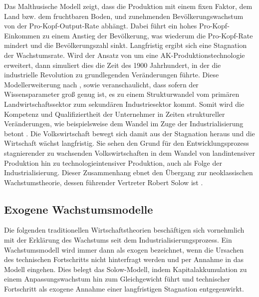 %
Das Malthusische Modell zeigt, dass die Produktion mit einem fixen Faktor, dem Land bzw. dem fruchtbaren Boden, und zunehmenden Bevölkerungswachstum von der Pro-Kopf-Output-Rate abhängt. Dabei führt ein hohes Pro-Kopf-Einkommen zu einem Anstieg der Bevölkerung, was wiederum die Pro-Kopf-Rate mindert und die Bevölkerungszahl sinkt.  Langfristig ergibt sich eine Stagnation der Wachstumsrate. Wird der Ansatz von \cite{Malthus.1798} um eine AK-Produktionstechnologie erweitert, dann simuliert dies die Zeit des 1900 Jahrhundert, in der die industrielle Revolution zu grundlegenden Veränderungen führte. Diese Modellerweiterung nach \cite{Hansen.2002}, sowie \cite{Ashraf.2008} veranschaulicht, dass sofern der Wissensparameter groß genug ist, es zu einem Strukturwandel vom primären Landwirtschaftssektor zum sekundären Industriesektor kommt. Somit wird die Kompetenz und Qualifiziertheit der Unternehmer in Zeiten struktureller Veränderungen, wie beispielsweise dem Wandel im Zuge der Industrialisierung betont \cite{Galor.1997}.
Die Volkswirtschaft bewegt sich damit aus der Stagnation heraus und die Wirtschaft wächst langfristig. Sie sehen den Grund für den Entwicklungsprozess stagnierender zu wachsenden Volkswirtschaften in dem Wandel von landintensiver Produktion hin zu technologieintensiver Produktion, auch als Folge der Industrialisierung. Dieser Zusammenhang ebnet den Übergang zur neoklassischen Wachstumstheorie, dessen führender Vertreter Robert Solow ist \cite{Hansen.2002}.
%
\subsection{Exogene Wachstumsmodelle}
Die folgenden traditionellen Wirtschaftstheorien beschäftigen sich vornehmlich mit der Erklärung des Wachstums seit dem Industrialisierungsprozess. Ein Wachstumsmodell wird immer dann als exogen bezeichnet, wenn die Ursachen des technischen Fortschritts nicht hinterfragt werden und per Annahme in das Modell eingehen. Dies belegt das Solow-Modell, indem Kapitalakkumulation zu einem Anpassungswachstum hin zum Gleichgewicht führt und technischer Fortschritt als exogene Annahme einer langfristigen Stagnation entgegenwirkt.
%
